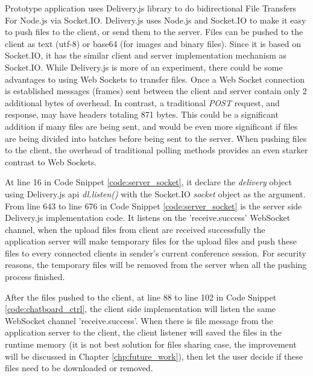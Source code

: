 \par Prototype application uses Delivery.js library to do bidirectional File Transfers For Node.js via Socket.IO. Delivery.js uses Node.js and Socket.IO to make it easy to push files to the client, or send them to the server. Files can be pushed to the client as text (utf-8) or base64 (for images and binary files).\cite{github:deliveryjs} Since it is based on Socket.IO, it has the similar client and server implementation mechanism as Socket.IO. While Delivery.js is more of an experiment, there could be some advantages to using Web Sockets to transfer files. Once a Web Socket connection is established messages (frames) sent between the client and server contain only 2 additional bytes of overhead. In contrast, a traditional \textit{POST} request, and response, may have headers totaling 871 bytes. This could be a significant addition if many files are being sent, and would be even more significant if files are being divided into batches before being sent to the server. When pushing files to the client, the overhead of traditional polling methods provides an even starker contrast to Web Sockets.

\par At line 16 in Code Snippet \ref{code:server_socket}, it declare the \textit{delivery} object using Delivery.js \gls{api} \textit{dl.listen()} with the Socket.IO \textit{socket} object as the argument. From line 643 to line 676 in Code Snippet \ref{code:server_socket} is the server side Delivery.js implementation code. It listens on the 'receive.success' WebSocket channel, when the upload files from client are received successfully the application server will make temporary files for the upload files and push these files to every connected clients in sender's current conference session. For security reasons, the temporary files will be removed from the server when all the pushing process finished.

\par After the files pushed to the client, at line 88 to line 102 in Code Snippet \ref{code:chatboard_ctrl}, the client side implementation will listen the same WebSocket channel 'receive.success'. When there is file message from the application server to the client, the client listener will saved the files in the runtime memory (it is not best solution for files sharing case, the improvement will be discussed in Chapter \ref{chp:future_work}), then let the user decide if these files need to be downloaded or removed.

